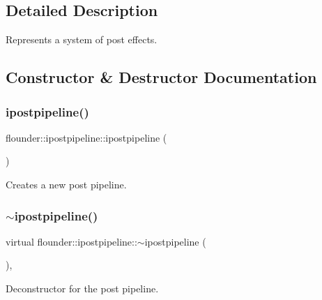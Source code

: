 \subsection{Detailed Description}
Represents a system of post effects. 



\subsection{Constructor \& Destructor Documentation}
\mbox{\label{classflounder_1_1ipostpipeline_a778c68518cfcdf1de4052264538b28d3}} 
\subsubsection{\texorpdfstring{ipostpipeline()}{ipostpipeline()}}
{\footnotesize\ttfamily flounder\+::ipostpipeline\+::ipostpipeline (\begin{DoxyParamCaption}{ }\end{DoxyParamCaption})\hspace{0.3cm}{\ttfamily [inline]}}



Creates a new post pipeline. 

\mbox{\label{classflounder_1_1ipostpipeline_a5d8e916ae2d5a3153449a61caa4399f6}} 
\subsubsection{\texorpdfstring{$\sim$ipostpipeline()}{~ipostpipeline()}}
{\footnotesize\ttfamily virtual flounder\+::ipostpipeline\+::$\sim$ipostpipeline (\begin{DoxyParamCaption}{ }\end{DoxyParamCaption})\hspace{0.3cm}{\ttfamily [inline]}, {\ttfamily [virtual]}}



Deconstructor for the post pipeline. 



